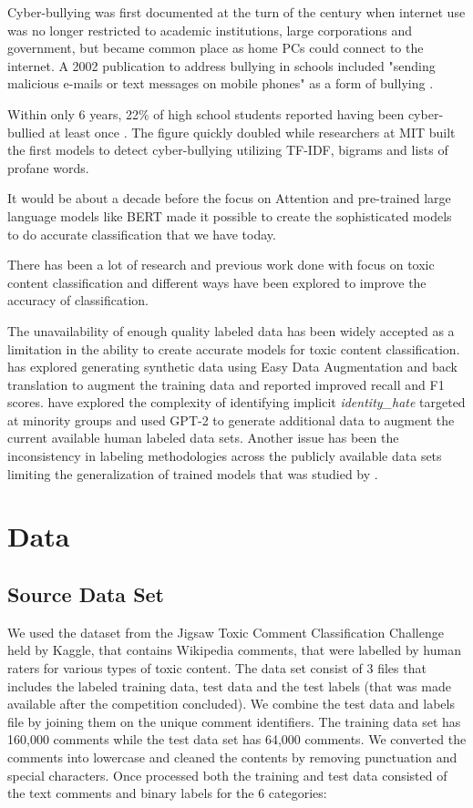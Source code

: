 \documentclass[11pt,a4paper]{article}
\begin{document}
Cyber-bullying was first documented at the turn of the century when internet use was no longer restricted to academic institutions, large corporations and government, but became common place as home PCs could connect to the internet.  A 2002 publication to address bullying in schools included "sending malicious e-mails or text messages on mobile phones" as a form of bullying  \cite{haworth2002bullying}.

Within only 6 years, 22\% of high school students reported having been cyber-bullied at least once \cite{smith2008cyberbullying}.  The figure quickly doubled while researchers at MIT built the first models to detect cyber-bullying \cite{dinakar2011modeling} utilizing TF-IDF, bigrams and lists of profane words.

It would be about a decade before the focus on Attention \cite{NIPS2017_3f5ee243} and pre-trained large language models like BERT \cite{devlin2018bert} made it possible to create the sophisticated models to do accurate classification that we have today. 

There has been a lot of research and previous work done with focus on toxic content classification and different ways have been explored to improve the accuracy of classification. 

The unavailability of enough quality labeled data has been widely accepted as a limitation in the ability to create accurate models for toxic content classification. \citet*{rastogi2020can} has explored generating synthetic data using Easy Data Augmentation and back translation to augment the training data and reported improved recall and F1 scores. \citet*{hartvigsen2022toxigen} have explored the complexity of identifying implicit \emph{identity\_hate} targeted at minority groups and used GPT-2 to generate additional data to augment the current available human labeled data sets. 
Another issue has been the inconsistency in labeling methodologies across the publicly available data sets limiting the generalization of trained models that was studied by \citet*{fortuna2020toxic}. 

\section{Data}

\subsection{Source Data Set}
We used the dataset from the Jigsaw Toxic Comment Classification Challenge held by Kaggle, that contains Wikipedia comments, that were labelled by human raters for various types of toxic content.  The data set consist of 3 files that includes the labeled training data, test data and the test labels (that was made available after the competition concluded).  We combine the test data and labels file by joining them on the unique comment identifiers. The training data set has 160,000 comments while the test data set has 64,000 comments. We converted the comments into lowercase and cleaned the contents by removing punctuation and special characters. Once processed both the training and test data  consisted of the text comments and binary labels for the 6 categories:
\end{document}
